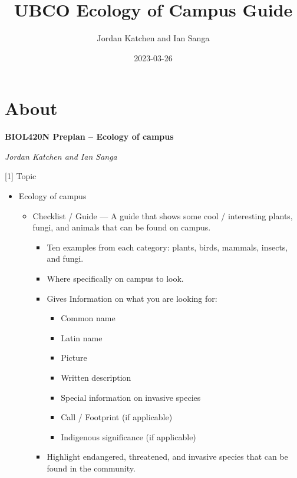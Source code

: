 \documentclass[
]{book}
\title{UBCO Ecology of Campus Guide}
\author{Jordan Katchen and Ian Sanga}
\date{2023-03-26}
\providecommand{\tightlist}{%
  \setlength{\itemsep}{0pt}\setlength{\parskip}{0pt}}
\begin{document}
\maketitle

{
\setcounter{tocdepth}{1}
\tableofcontents
}
\hypertarget{about}{%
\chapter{About}\label{about}}

\textbf{BIOL420N Preplan -- Ecology of campus}

\emph{Jordan Katchen and Ian Sanga}

{{[}1{]} Topic}

\begin{itemize}
\tightlist
\item
  Ecology of campus

  \begin{itemize}
  \tightlist
  \item
    Checklist / Guide --- A guide that shows some cool / interesting plants, fungi, and animals that can be found on campus.

    \begin{itemize}
    \tightlist
    \item
      Ten examples from each category: plants, birds, mammals, insects, and fungi.
    \item
      Where specifically on campus to look.
    \item
      Gives Information on what you are looking for:

      \begin{itemize}
      \tightlist
      \item
        Common name
      \item
        Latin name
      \item
        Picture
      \item
        Written description
      \item
        Special information on invasive species
      \item
        Call / Footprint (if applicable)
      \item
        Indigenous significance (if applicable)
      \end{itemize}
    \item
      Highlight endangered, threatened, and invasive species that can be found in the community.
    \end{itemize}
  \end{itemize}
\end{itemize}
\end{document}

